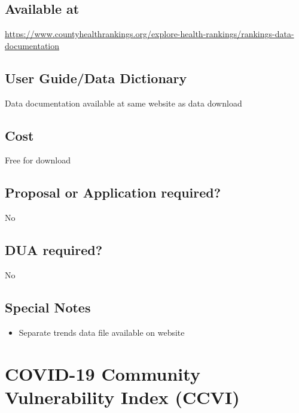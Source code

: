 \documentclass[
]{book}
\providecommand{\tightlist}{%
  \setlength{\itemsep}{0pt}\setlength{\parskip}{0pt}}
\begin{document}
\hypertarget{available-at-20}{%
\section{Available at}\label{available-at-20}}

\url{https://www.countyhealthrankings.org/explore-health-rankings/rankings-data-documentation}

\hypertarget{user-guidedata-dictionary-20}{%
\section{User Guide/Data Dictionary}\label{user-guidedata-dictionary-20}}

Data documentation available at same website as data download

\hypertarget{cost-20}{%
\section{Cost}\label{cost-20}}

Free for download

\hypertarget{proposal-or-application-required-20}{%
\section{Proposal or Application required?}\label{proposal-or-application-required-20}}

No

\hypertarget{dua-required-20}{%
\section{DUA required?}\label{dua-required-20}}

No

\hypertarget{special-notes-20}{%
\section{Special Notes}\label{special-notes-20}}

\begin{itemize}
\tightlist
\item
  Separate trends data file available on website
\end{itemize}

\mainmatter

\hypertarget{covid-19-community-vulnerability-index-ccvi}{%
\chapter{COVID-19 Community Vulnerability Index (CCVI)}\label{covid-19-community-vulnerability-index-ccvi}}
\end{document}
